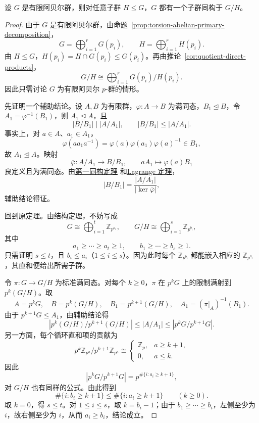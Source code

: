 \begin{theorem}\label{thm:finite-abelian-quotient-embeds}
设 $G$ 是有限阿贝尔群，则对任意子群 $H\leq G$，$G$ 都有一个子群同构于 $G/H$。
\end{theorem}

\begin{proof}
由于 $G$ 是有限阿贝尔群，由命题~\ref{prop:torsion-abelian-primary-decomposition}，
\[
  G=\bigoplus_{i=1}^{r}G(p_i),\qquad
  H=\bigoplus_{i=1}^{r}H(p_i).
\]
由 $H\leq G$，$H(p_i)=H\cap G(p_i)\leq G(p_i)$。再由推论~\ref{cor:quotient-direct-products}，
\[
  G/H\cong\bigoplus_{i=1}^{r}G(p_i)/H(p_i).
\]
因此只需讨论 $G$ 为有限阿贝尔 $p$-群的情形。

先证明一个辅助结论。设 $A,B$ 为有限群，$\varphi:A\to B$ 为满同态，$B_1\trianglelefteq B$，令 $A_1=\varphi^{-1}(B_1)$，则 $A_1\trianglelefteq A$，且
\[
  |B/B_1|\mid|A/A_1|,\qquad |B/B_1|\leq|A/A_1|.
\]
事实上，对 $a\in A$、$a_1\in A_1$，
\[
  \varphi(aa_1a^{-1})
  =\varphi(a)\varphi(a_1)\varphi(a)^{-1}\in B_1,
\]
故 $A_1\trianglelefteq A$。映射
\[
  \overline\varphi:A/A_1\longrightarrow B/B_1,\qquad
  aA_1\longmapsto\varphi(a)B_1
\]
良定义且为满同态。由\hyperref[cor:first-isomorphism]{第一同构定理}
和\hyperref[cor:lagrange]{Lagrange 定理}，
\[
  |B/B_1|=\frac{|A/A_1|}{|\ker\overline\varphi|},
\]
辅助结论得证。

回到原定理。由结构定理，不妨写成
\[
  G\cong\bigoplus_{i=1}^{t}\mathbb Z_{p^{a_i}},
  \qquad
  G/H\cong\bigoplus_{i=1}^{s}\mathbb Z_{p^{b_i}},
\]
其中
\[
  a_1\geq\cdots\geq a_t\geq1,\qquad
  b_1\geq\cdots\geq b_s\geq1.
\]
只需证明 $s\leq t$，且 $b_i\leq a_i$（$1\leq i\leq s$）。因为此时每个 $\mathbb Z_{p^{b_i}}$ 都能嵌入相应的 $\mathbb Z_{p^{a_i}}$，其直和便给出所需子群。

令 $\pi:G\to G/H$ 为标准满同态。对每个 $k\geq0$，$\pi$ 在 $p^kG$ 上的限制满射到 $p^k(G/H)$。取
\[
  A=p^kG,\quad B=p^k(G/H),\quad B_1=p^{k+1}(G/H),
  \quad A_1=(\pi|_A)^{-1}(B_1).
\]
由于 $p^{k+1}G\leq A_1$，由辅助结论得
\[
  \left|p^k(G/H)/p^{k+1}(G/H)\right|
  \leq |A/A_1|
  \leq \left|p^kG/p^{k+1}G\right|.
\]
另一方面，每个循环直和项的贡献为
\[
  p^k\mathbb Z_{p^a}/p^{k+1}\mathbb Z_{p^a}
  \cong
  \begin{cases}
    \mathbb Z_p,&a\geq k+1,\\
    0,&a\leq k.
  \end{cases}
\]
因此
\[
  \left|p^kG/p^{k+1}G\right|
  =p^{\#\{i:a_i\geq k+1\}},
\]
对 $G/H$ 也有同样的公式。由此得到
\[
  \#\{i:b_i\geq k+1\}
  \leq\#\{i:a_i\geq k+1\}
  \qquad(k\geq0).
\]
取 $k=0$，得 $s\leq t$。对 $1\leq i\leq s$，取 $k=b_i-1$；由于 $b_1\geq\cdots\geq b_i$，左侧至少为 $i$，故右侧至少为 $i$，从而 $a_i\geq b_i$，结论成立。
\end{proof}

